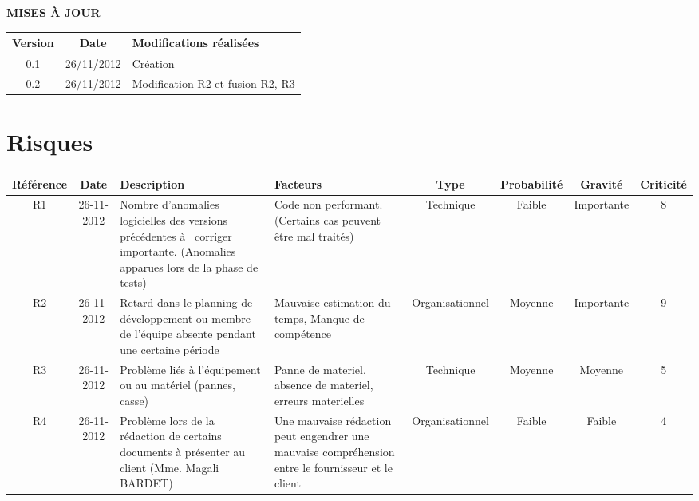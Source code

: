 \documentclass[a4paper,11pt,french]{article}
\begin{document}
\makeFirstPage
\clearpage
\vspace*{1cm}
\begin{center}
\textbf{\huge{MISES À JOUR}}\\
\vspace*{3cm}
	\begin{tabularx}{16cm}{|c|c|X|}
    \hline
	\bfseries{Version} & \bfseries{Date} & \bfseries{Modifications réalisées}\\
	\hline
	0.1 & 26/11/2012 & Création\\
	\hline
	0.2 & 26/11/2012 & Modification R2 et fusion R2, R3\\
	\hline
	\end{tabularx}
\end{center}

\clearpage


\section{Risques}
\begin{flushleft}
\begin{small} 
\begin{tabularx}{18cm}{|c|c|p{2.28cm}|p{2cm}|c|c|c|c|}
\hline
\cellcolor[gray]{.7} Référence & \cellcolor[gray]{.7} Date & 
\cellcolor[gray]{.7}Description & \cellcolor[gray]{.7}Facteurs & 
\cellcolor[gray]{.7}Type & \cellcolor[gray]{.7}Probabilité & 
\cellcolor[gray]{.7}Gravité &
\cellcolor[gray]{.7}Criticité\\
\hline
R1 & 26-11-2012 & 
Nombre d'anomalies logicielles des versions précédentes
à  corriger importante. (Anomalies apparues lors de la phase de tests)
& Code non performant. (Certains cas peuvent être mal traités)
& Technique & Faible & Importante & 8 \\
\hline
R2 & 26-11-2012 &
Retard dans le planning de
développement ou membre de l'équipe absente pendant une certaine période
& Mauvaise estimation du temps, Manque de compétence
& Organisationnel & Moyenne & Importante & 9 \\
\hline 
R3 & 26-11-2012 &
Problème liés à l'équipement ou au matériel (pannes, casse)
& 
Panne de materiel, absence de materiel, erreurs materielles 
& Technique & Moyenne & Moyenne & 5 \\
\hline
R4 & 26-11-2012 & Problème lors de la rédaction de certains documents à
présenter au client (Mme. Magali BARDET)
& Une mauvaise rédaction peut engendrer une mauvaise compréhension entre le
fournisseur et le client
& Organisationnel & Faible & Faible & 4 \\
\hline
\end{tabularx}

\end{small}
\end{flushleft}
\end{document}
